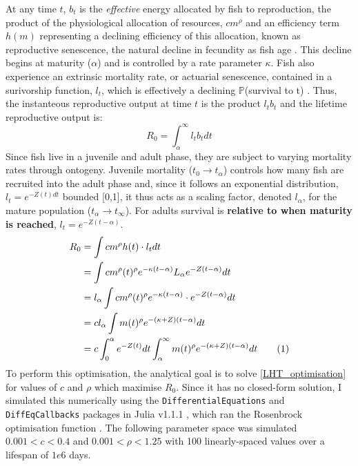 \documentclass[a4paper]{article} %
\newcommand\numberthis{\addtocounter{equation}{1}\tag{\theequation}}
\begin{document}
At any time $t$, $b_{t}$ is the \textit{effective} energy allocated by fish to reproduction, the product of the physiological allocation of resources, $cm^{\rho}$ and an efficiency term $h(m)$ representing a declining efficiency of this allocation, known as reproductive senescence, the natural decline in fecundity as fish age \autocite{Stearns2000, Benoit2018, Vrtilek2018}. This decline begins at maturity ($\alpha$) and is controlled by a rate parameter $\kappa$. Fish also experience an extrinsic mortality rate, or actuarial senescence, contained in a surivorship function, $l_t$, which is effectively a declining $\mathbb{P}$(survival to t) \autocite{Charnov1993, Charnov2001, Benoit2018, Laird2010, Reznick2002, Reznick2006}. Thus, the instanteous reproductive output at time $t$ is the product $l_{t}b_{t}$ and the lifetime reproductive output is:
\begin{equation}
    R_{0} = \int_{\alpha}^{\infty}l_{t}b_{t} dt
\end{equation}
Since fish live in a juvenile and adult phase, they are subject to varying mortality rates through ontogeny. Juvenile mortality ($t_0 \rightarrow t_{\alpha}$) controls how many fish are recruited into the adult phase and, since it follows an exponential distribution, $l_t = e^{-Z(t)dt}$ bounded [0,1], it thus acts as a scaling factor, denoted $l_{\alpha}$, for the mature population ($t_{\alpha} \rightarrow t_{\infty}$). For adults survival is \textbf{relative to when maturity is reached}, $l_{t} = e^{-Z(t-\alpha)}$.
\begin{align*}
    R_{0} &= \int cm^{\rho}h(t) \cdot l_{t} dt \\
          &= \int cm^{\rho}(t)^{\rho} e^{-\kappa(t-\alpha)} L_{\alpha}e^{-Z(t-\alpha)} dt \\
          &= l_{\alpha}\int cm^{\rho}(t)^{\rho} e^{-\kappa(t-\alpha)} \cdot e^{-Z(t-\alpha)} dt \\
          &= cl_{\alpha}\int m(t)^{\rho} e^{-(\kappa+Z)(t-\alpha)} dt \\
          &= c\int_{0}^{\alpha}e^{-Z(t)}dt\int_{\alpha}^{\infty} m(t)^{\rho} e^{-(\kappa+Z)(t-\alpha)} dt \numberthis \label{LHT_optimisation}
\end{align*}
To perform this optimisation, the analytical goal is to solve \cref{LHT_optimisation} for values of $c$ and $\rho$ which maximise $R_0$. Since it has no closed-form solution, I simulated this numerically using the \texttt{DifferentialEquations} and \texttt{DiffEqCallbacks} packages in Julia v1.1.1 \autocite{Bezanson2017}, which ran the Rosenbrock optimisation function \autocite{Rosenbrock1960}. The following parameter space was simulated $0.001 < c < 0.4$ and $0.001 < \rho < 1.25$ with 100 linearly-spaced values over a lifespan of $1e6$ days.
\end{document}
